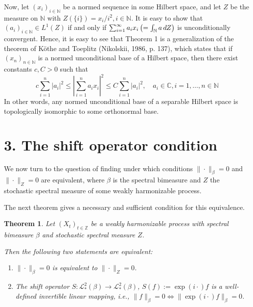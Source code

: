 \documentclass{article}
\newcommand{\assign}{:=}
\newcommand{\cdummy}{\cdot}
\newtheorem{theorem}{Theorem}
\begin{document}
Now, let $(x_i)_{i \in \mathbb{N}}$ be a normed sequence in some Hilbert
space, and let $Z$ be the measure on $\mathbb{N}$ with $Z (\{i\}) = x_i / i^2,
i \in \mathbb{N}$. It is easy to show that $(a_i)_{i \in \mathbb{N}} \in L^1
(Z)$ if and only if $\sum_{i = 1}^{\infty} a_i x_i  \left( = \int_{\mathbb{N}}
a \hspace{0.17em} dZ \right)$ is unconditionally convergent. Hence, it is easy
to see that Theorem 1 is a generalization of the theorem of K{\"o}the and
Toeplitz (Nikolskii, 1986, p. 137), which states that if $(x_n)_{n \in
\mathbb{N}}$ is a normed unconditional base of a Hilbert space, then there
exist constants $c, C > 0$ such that
\begin{equation}
  c \sum_{i = 1}^n |a_i |^2 \leq \left| \sum_{i = 1}^n a_i x_i \right|^2 \leq
  C \sum_{i = 1}^n |a_i |^2, \quad a_i \in \mathbb{C}, i = 1, \ldots, n \in
  \mathbb{N}
\end{equation}
In other words, any normed unconditional base of a separable Hilbert space is
topologically isomorphic to some orthonormal base.

\section*{3. The shift operator condition}

We now turn to the question of finding under which conditions $\| \cdummy
\|_{\beta} = 0$ and $\| \cdummy \|_Z = 0$ are equivalent, where $\beta$ is the
spectral bimeasure and $Z$ the stochastic spectral measure of some weakly
harmonizable process.

The next theorem gives a necessary and sufficient condition for this
equivalence.

\begin{theorem}
  Let $(X_t)_{t \in \mathbb{Z}}$ be a weakly harmonizable process with
  spectral bimeasure $\beta$ and stochastic spectral measure $Z$.
  
  Then the following two statements are equivalent:
  \begin{enumerate}
    \item $\| \cdummy \|_{\beta} = 0$ is equivalent to $\| \cdummy \|_Z = 0$.
    
    \item The shift operator $S : \mathscr{L}_{\ast}^2 (\beta) \to
    \mathscr{L}_{\ast}^2 (\beta)$, $S (f) \assign \exp (i \cdummy) f$ is a
    well-defined invertible linear mapping, i.e., $\|f\|_{\beta} = 0
    \Leftrightarrow \| \exp (i \cdot) f\|_{\beta} = 0$.
  \end{enumerate}
\end{theorem}
\end{document}
